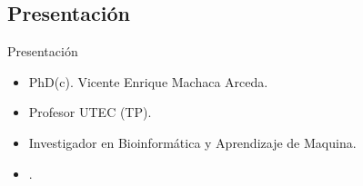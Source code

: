 \documentclass[10pt]{beamer}
\newcommand{\chref}[3][blue]{\href{#2}{\color{#1}{#3}}}%
\newcommand{\chref}[2]{	\href{#1}{{\usebeamercolor[bg]{Feather}#2}} }
\newcommand{\chref}[3][blue]{\href{#2}{\color{#1}{#3}}}%
\newcommand{\1}{
        	\setbeamertemplate{background}{
        		\texttt{[image: img/1]}
        		\tikz[overlay] \fill[fill opacity=0.75,fill=white] (0,0) rectangle (-\paperwidth,\paperheight);
        	}
}
\begin{document}
\subsection{Presentación}

\begin{frame}{Presentación}{}
	\begin{itemize}
		\item<1-> PhD(c). Vicente Enrique Machaca Arceda. 
		\item<2-> Profesor UTEC (TP).
		\item<3-> Investigador en Bioinformática y Aprendizaje de Maquina.	
		\item<4-> \chref{https://scholar.google.com/citations?user=Y2taS2MAAAAJ&hl=es&oi=ao}{Index-h 5}.  	
	\end{itemize}
\end{frame}
\end{document}
